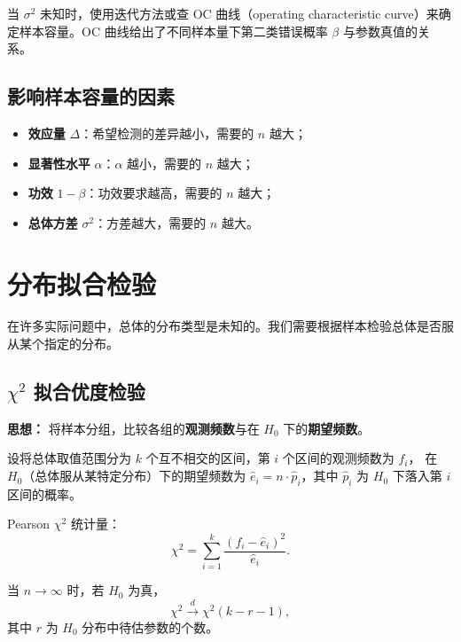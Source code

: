 当 $\sigma^2$ 未知时，使用迭代方法或查 OC 曲线（operating characteristic curve）来确定样本容量。OC 曲线给出了不同样本量下第二类错误概率 $\beta$ 与参数真值的关系。

\subsection{影响样本容量的因素}

\begin{itemize}
    \item \textbf{效应量} $\Delta$：希望检测的差异越小，需要的 $n$ 越大；
    \item \textbf{显著性水平} $\alpha$：$\alpha$ 越小，需要的 $n$ 越大；
    \item \textbf{功效} $1-\beta$：功效要求越高，需要的 $n$ 越大；
    \item \textbf{总体方差} $\sigma^2$：方差越大，需要的 $n$ 越大。
\end{itemize}

\section{分布拟合检验}

在许多实际问题中，总体的分布类型是未知的。我们需要根据样本检验总体是否服从某个指定的分布。

\subsection{$\chi^2$ 拟合优度检验}

\textbf{思想：} 将样本分组，比较各组的\textbf{观测频数}与在 $H_0$ 下的\textbf{期望频数}。

\begin{definition}
设将总体取值范围分为 $k$ 个互不相交的区间，第 $i$ 个区间的观测频数为 $f_i$，
在 $H_0$（总体服从某特定分布）下的期望频数为 $\hat{e}_i = n \cdot \hat{p}_i$，其中 $\hat{p}_i$ 为 $H_0$ 下落入第 $i$ 区间的概率。

Pearson $\chi^2$ 统计量：
\begin{equation}
    \chi^2 = \sum_{i=1}^{k} \frac{(f_i - \hat{e}_i)^2}{\hat{e}_i}.
\end{equation}
\end{definition}

当 $n \to \infty$ 时，若 $H_0$ 为真，
\begin{equation}
    \chi^2 \xrightarrow{d} \chi^2(k - r - 1),
\end{equation}
其中 $r$ 为 $H_0$ 分布中待估参数的个数。

